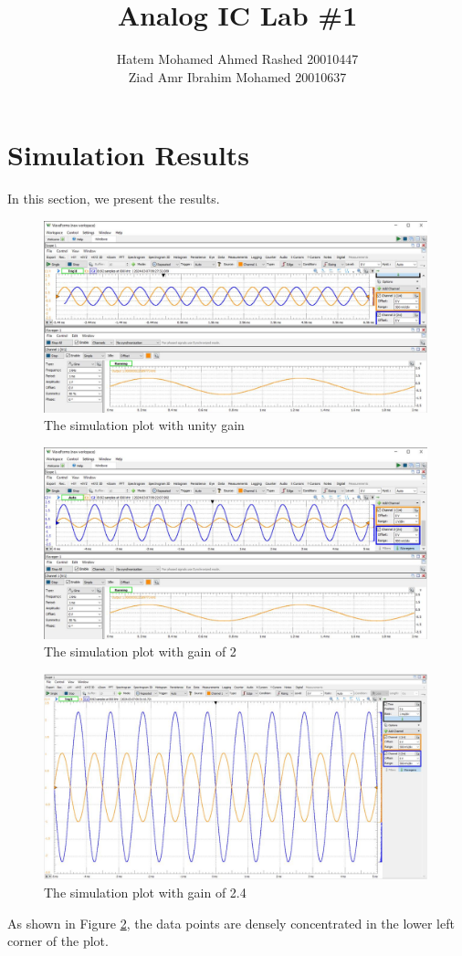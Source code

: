 \documentclass{article}
\begin{document}
\title{\textbf{Analog IC Lab \#1}}
\date{} %
\author{{Hatem Mohamed Ahmed Rashed}{	20010447} \\
	{Ziad Amr Ibrahim Mohamed}{	20010637} }
\maketitle
	
	\section{Simulation Results}
	
	In this section, we present the results.
	
	\begin{figure}[htbp]
		\centering
		\includegraphics[width=0.99\textwidth]{unity_gain.jpg}
		\caption{The simulation plot with unity gain}
		\label{fig:unity}
	\end{figure}
	
	\begin{figure}[htbp]
		\centering
		\includegraphics[width=0.99\textwidth]{gain_2.jpg}
		\caption{The simulation plot with gain of 2}
		\label{fig:gain2}
	\end{figure}
	
		\begin{figure}[htbp]
		\centering
		\includegraphics[width=0.99\textwidth]{gain2_4.jpg}
		\caption{The simulation plot with gain of 2.4}
		\label{fig:gain2_4}
	\end{figure}
	
	As shown in Figure \ref{fig:gain2}, the data points are densely concentrated in the lower left corner of the plot.
	
\end{document}
